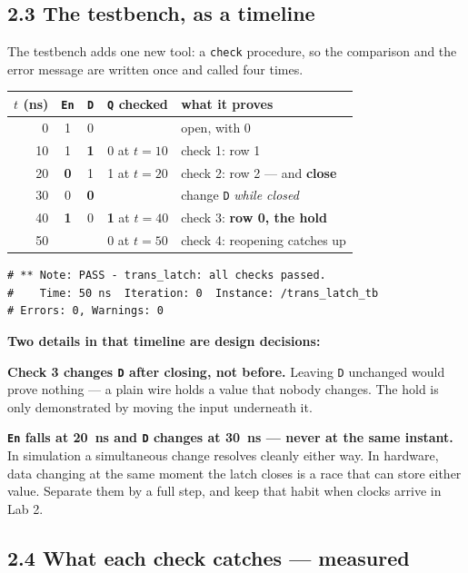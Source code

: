 \documentclass[11pt]{article}
\newcommand{\code}[1]{\texttt{#1}}
\newcommand{\ok}{\checkmark}
\begin{document}
\subsection*{2.3 The testbench, as a timeline}

The testbench adds one new tool: a \code{check} procedure, so the comparison and the
error message are written once and called four times.

\begin{center}
\begin{tabular}{r|cc|c|l}
\toprule
$t$ (ns) & \code{En} & \code{D} & \code{Q} checked & what it proves \\
\midrule
0  & 1 & 0 & & open, with 0 \\
10 & 1 & \textbf{1} & 0 at $t{=}10$ \ok & check 1: row 1 \\
20 & \textbf{0} & 1 & 1 at $t{=}20$ \ok & check 2: row 2 --- and \textbf{close} \\
30 & 0 & \textbf{0} & & change \code{D} \emph{while closed} \\
40 & \textbf{1} & 0 & \textbf{1} at $t{=}40$ \ok & check 3: \textbf{row 0, the hold} \\
50 & & & 0 at $t{=}50$ \ok & check 4: reopening catches up \\
\bottomrule
\end{tabular}
\end{center}

\begin{lstlisting}
# ** Note: PASS - trans_latch: all checks passed.
#    Time: 50 ns  Iteration: 0  Instance: /trans_latch_tb
# Errors: 0, Warnings: 0
\end{lstlisting}

\textbf{Two details in that timeline are design decisions:}

\textbf{Check 3 changes \code{D} after closing, not before.} Leaving \code{D}
unchanged would prove nothing --- a plain wire holds a value that nobody changes.
The hold is only demonstrated by moving the input underneath it.

\textbf{\code{En} falls at 20~ns and \code{D} changes at 30~ns --- never at the same
instant.} In simulation a simultaneous change resolves cleanly either way. In
hardware, data changing at the same moment the latch closes is a race that can store
either value. Separate them by a full step, and keep that habit when clocks arrive in
Lab 2.

\subsection*{2.4 What each check catches --- measured}
\end{document}
